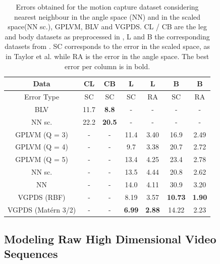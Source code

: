 \documentclass{article} %
\begin{document}
\begin{table}[h]
\caption{
\small{
Errors obtained for the motion capture dataset considering nearest neighbour in the angle space (NN) and in the scaled space(NN sc.), GPLVM, BLV and VGPDS. CL / CB are the leg and body datasets as preprocessed in \cite{Taylor}, L and B the corresponding datasets from \cite{gplvmLarger}. SC corresponds to the error in the scaled space, as in Taylor et al. while RA is the error in the angle space. The best error per column is in bold. }}
\label{motionCaptureTable}
\begin{center}
\begin{tabular}{c||c|c|c|c|c|c}
Data & CL & CB & L & L & B & B \\  \hline
Error Type & SC & SC & SC & RA & SC & RA \\
\hline \hline
BLV 			       & 11.7 & \textbf{8.8} & - & - & - & - \\  \hline
NN sc.   		       & 22.2 & \textbf{20.5} & - & - & - & - \\ \hline
GPLVM (Q = 3)	       & - & - & 11.4 & 3.40 & 16.9 & 2.49 \\ \hline
GPLVM (Q = 4)	       & - & - & 9.7  & 3.38 & 20.7 & 2.72 \\ \hline
GPLVM (Q = 5)	       & - & - & 13.4 & 4.25 & 23.4 & 2.78 \\ \hline
NN sc.  		       & - & - & 13.5 & 4.44 & 20.8 & 2.62 \\ \hline
NN 		 		       & - & - & 14.0 & 4.11 & 30.9 & 3.20 \\ \hline
VGPDS (RBF)        & - & - & 8.19 & 3.57 & \textbf{10.73} & \textbf{1.90} \\ \hline
VGPDS (Mat\'ern 3/2) & - & - & \textbf{6.99} & \textbf{2.88} & 14.22 & 2.23 \\
\end{tabular}
\end{center}
\end{table}


\subsection{Modeling Raw High Dimensional Video Sequences}
\end{document}
